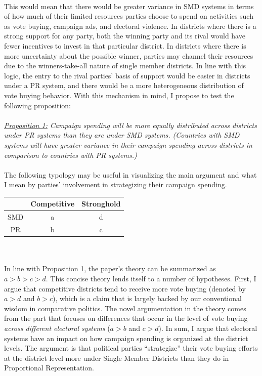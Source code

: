 \documentclass{article}
\begin{document}
\\
This would mean that there would be greater variance in SMD systems in terms of how much of their limited resources parties choose to spend on activities such as vote buying, campaign ads, and electoral violence. In districts where there is a strong support for any party, both the winning party and its rival would have fewer incentives to invest in that particular district. In districts where there is more uncertainty about the possible winner, parties may channel their resources due to the winners-take-all nature of single member districts. In line with this logic, the entry to the rival parties' basis of support would be easier in districts under a PR system, and there would be a more heterogeneous distribution of vote buying behavior. With this mechanism in mind, I propose to test the following proposition:\\
\\
\textit{\underline{Proposition 1:} Campaign spending will be more equally distributed across districts under PR systems than they are under SMD systems. (Countries with SMD systems will have greater variance in their campaign spending across districts in comparison to countries with PR systems.)}\\
\\
The following typology may be useful in visualizing the main argument and what I mean by parties' involvement in strategizing their campaign spending.
\begin{center}
	\begin{tabular}{ |c|c|c| } 
		\hline
		 & Competitive & Stronghold \\ 
		\hline
		SMD & a & d \\ 
		\hline
		PR & b & c \\ 
		\hline
	\end{tabular}
\end{center}\\
\\
In line with Proposition 1, the paper's theory can be summarized as $a>b>c>d$. This concise theory lends itself to a number of hypotheses. First, I argue that competitive districts tend to receive more vote buying (denoted by $a>d$ and $b>c$), which is a claim that is largely backed by our conventional wisdom in comparative politics. The novel argumentation in the theory comes from the part that focuses on differences that occur in the level of vote buying \textit{across different electoral systems} ($a>b$ and $c>d$). In sum, I argue that electoral systems have an impact on how campaign spending is organized at the district levels. The argument is that political parties ``strategize'' their vote buying efforts at the district level more under Single Member Districts than they do in Proportional Representation. 
\end{document}
